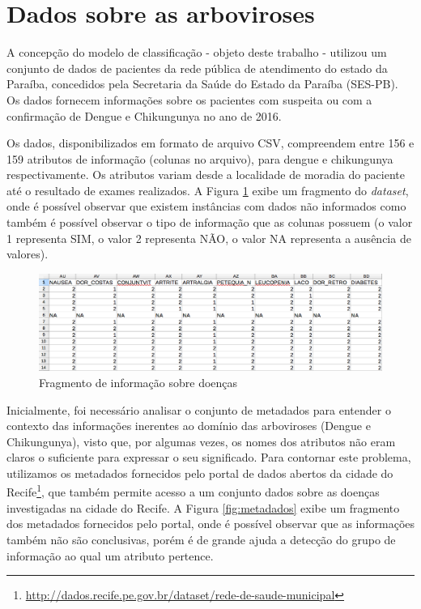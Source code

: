 \section{Dados sobre as arboviroses}

A concepção do modelo de classificação - objeto deste trabalho - utilizou um conjunto de dados de pacientes da rede pública de atendimento do estado da Paraíba, concedidos pela Secretaria da Saúde do Estado da Paraíba (SES-PB). Os dados fornecem informações sobre os pacientes com suspeita ou com a confirmação de Dengue e Chikungunya no ano de 2016.

Os dados, disponibilizados em formato de arquivo CSV, compreendem entre 156 e 159 atributos de informação (colunas no arquivo), para dengue e chikungunya respectivamente. Os atributos variam desde a localidade de moradia do paciente até o resultado de exames realizados. A Figura \ref{fig:csvses} exibe um fragmento do \textit{dataset}, onde é possível observar que existem instâncias com dados não informados como também é possível observar o tipo de informação que as colunas possuem (o valor 1 representa SIM, o valor 2 representa NÃO, o valor NA representa a ausência de valores).

\begin{figure}[htb]
  \caption{\label{fig:csvses}Fragmento de informação sobre doenças}
  \begin{center}
    \includegraphics[width=\textwidth]{imagens/fragmentodosdados.png}
  \end{center}
\end{figure}

Inicialmente, foi necessário analisar o conjunto de metadados para entender o contexto das informações inerentes ao domínio das arboviroses (Dengue e Chikungunya), visto que, por algumas vezes, os nomes dos atributos não eram claros o suficiente para expressar o seu significado. Para contornar este problema, utilizamos os metadados fornecidos pelo portal de dados abertos da cidade do Recife\footnote{\url{http://dados.recife.pe.gov.br/dataset/rede-de-saude-municipal}}, que também permite acesso a um conjunto dados sobre as doenças investigadas na cidade do Recife. A Figura \ref{fig:metadados} exibe um fragmento dos metadados fornecidos pelo portal, onde é possível observar que as informações também não são conclusivas, porém é de grande ajuda a detecção do grupo de informação ao qual um atributo pertence.

